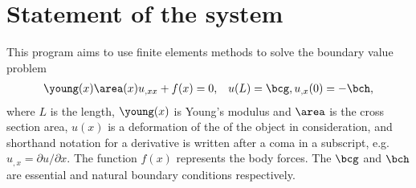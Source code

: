 \documentclass[twoside,a4paper,12pt]{article}
\begin{document}

\tableofcontents


\listoffigures
\listoftables




\section{Statement of the system}

This program aims to use finite elements methods to solve the boundary
value problem
%
\begin{align}
  \young(x) \area(x) u_{,xx} + f(x) = 0, \label{eq:bvp}
  &&u(L) = \bcg, u_{,x}(0) = -\bch,
\end{align}
where $L$ is the length, $\young(x)$ is Young's modulus and $\area$ is
the cross section area, $u(x)$ is a deformation of the of the object
in consideration, and shorthand notation for a derivative is written
after a coma in a subscript, e.g. $u_{,x} = \partial u /\partial x$.  The
function $f(x)$ represents the body forces. The $\bcg$ and $\bch$ are
essential and natural boundary conditions respectively.
\end{document}
